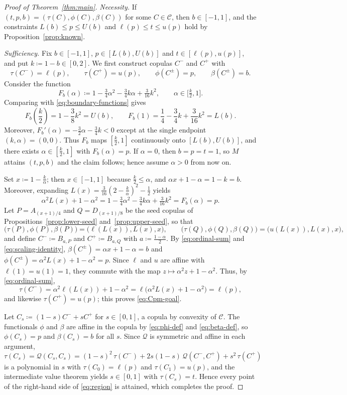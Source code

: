 \documentclass{article}
\newcommand{\C}{\mathcal{C}}
\newcommand{\Q}{\mathcal{Q}}
\begin{document}
\begin{proof}[Proof of Theorem~\ref{thm:main}]
\emph{Necessity.}
If $(t,p,b)=(\tau(C),\phi(C),\beta(C))$ for some $C\in\C$, then $b\in[-1,1]$, and the constraints $L(b)\le p\le U(b)$ and $\ell(p)\le t\le u(p)$ hold by Proposition~\ref{prop:known}.

\emph{Sufficiency.}
Fix $b\in[-1,1]$, $p\in[L(b),U(b)]$ and $t\in[\ell(p),u(p)]$, and put $k\coloneqq 1-b\in[0,2]$.
We first construct copulas $C^-$ and $C^+$ with
\begin{equation}\label{eq:Cpm-goal}
\tau(C^-)=\ell(p),\qquad \tau(C^+)=u(p),\qquad \phi(C^\pm)=p,\qquad \beta(C^\pm)=b.
\end{equation}
Consider the function
\[
F_b(\alpha)\coloneqq 1-\tfrac34\alpha^2-\tfrac34 k\alpha+\tfrac{3}{16}k^2,
\qquad \alpha\in\bigl[\tfrac k2,1\bigr].
\]
Comparing with \eqref{eq:boundary-functions} gives
\[
F_b(\frac k2)=1-\frac38k^2=U(b),
\qquad F_b(1)=\frac14-\frac34k+\frac{3}{16}k^2=L(b).
\]
Moreover, $F_b'(\alpha)=-\frac32\alpha-\frac34 k<0$ except at the single endpoint $(k,\alpha)=(0,0)$.
Thus $F_b$ maps $[\frac k2,1]$ continuously onto $[L(b),U(b)]$, and there exists $\alpha\in[\frac k2,1]$ with $F_b(\alpha)=p$.
If $\alpha=0$, then $b=p=t=1$, so $M$ attains $(t,p,b)$ and the claim follows; hence assume $\alpha>0$ from now on.

Set $x\coloneqq 1-\frac k\alpha$; then $x\in[-1,1]$ because $\frac k2\le\alpha$, and $\alpha x+1-\alpha=1-k=b$.
Moreover, expanding $L(x)=\frac{3}{16}(2-\frac k\alpha)^2-\frac12$ yields
\begin{equation}\label{eq:scaling-identity}
\alpha^2L(x)+1-\alpha^2
=1-\tfrac34\alpha^2-\tfrac34 k\alpha+\tfrac{3}{16}k^2
=F_b(\alpha)=p.
\end{equation}
Let $P=A_{(x+1)/4}$ and $Q=D_{(x+1)/8}$ be the seed copulas of Propositions~\ref{prop:lower-seed} and~\ref{prop:upper-seed}, so that
\[
\bigl(\tau(P),\phi(P),\beta(P)\bigr)=\bigl(\ell(L(x)),L(x),x\bigr),
\qquad
\bigl(\tau(Q),\phi(Q),\beta(Q)\bigr)=\bigl(u(L(x)),L(x),x\bigr),
\]
and define $C^-\coloneqq B_{a,P}$ and $C^+\coloneqq B_{a,Q}$ with $a\coloneqq \frac{1-\alpha}{2}$.
By \eqref{eq:ordinal-sum} and \eqref{eq:scaling-identity}, $\beta(C^\pm)=\alpha x+1-\alpha=b$ and $\phi(C^\pm)=\alpha^2L(x)+1-\alpha^2=p$.
Since $\ell$ and $u$ are affine with $\ell(1)=u(1)=1$, they commute with the map $z\mapsto\alpha^2z+1-\alpha^2$.
Thus, by \eqref{eq:ordinal-sum},
\[
\tau(C^-)=\alpha^2\ell(L(x))+1-\alpha^2=\ell\bigl(\alpha^2L(x)+1-\alpha^2\bigr)=\ell(p),
\]
and likewise $\tau(C^+)=u(p)$; this proves \eqref{eq:Cpm-goal}.

Let $C_s\coloneqq (1-s)C^-+sC^+$ for $s\in[0,1]$, a copula by convexity of $\C$.
The functionals $\phi$ and $\beta$ are affine in the copula by \eqref{eq:phi-def} and \eqref{eq:beta-def}, so $\phi(C_s)=p$ and $\beta(C_s)=b$ for all $s$.
Since $\Q$ is symmetric and affine in each argument,
\[
\tau(C_s)=\Q(C_s,C_s)=(1-s)^2\,\tau(C^-)+2s(1-s)\,\Q(C^-,C^+)+s^2\,\tau(C^+)
\]
is a polynomial in $s$ with $\tau(C_0)=\ell(p)$ and $\tau(C_1)=u(p)$, and the intermediate value theorem yields $s\in[0,1]$ with $\tau(C_s)=t$.
Hence every point of the right-hand side of \eqref{eq:region} is attained, which completes the proof.
\end{proof}
\end{document}
